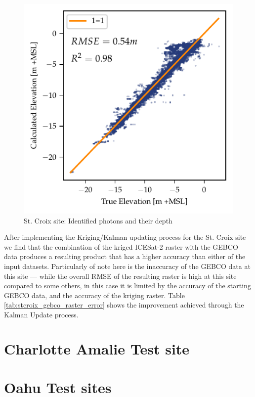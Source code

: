 \begin{figure}[htbp]
    \centering
    \includegraphics{figures/stcroix_lidar_estimated_vs_truth.pdf}
    \caption{St. Croix site: Identified photons and their depth}
    \label{fig:st-croix-bias-plot}
\end{figure}

After implementing the Kriging/Kalman updating process for the St. Croix site we find that the combination of the kriged ICESat-2 raster with the GEBCO data produces a resulting product that has a higher accuracy than either of the input datasets. Particularly of note here is the inaccuracy of the GEBCO data at this site --- while the overall RMSE of the resulting raster is high at this site compared to some others, in this case it is limited by the accuracy of the starting GEBCO data, and the accuracy of the kriging raster. Table \ref{tab:stcroix_gebco_raster_error} shows the improvement achieved through the Kalman Update process.



\section{Charlotte Amalie Test site}

\section{Oahu Test sites}

